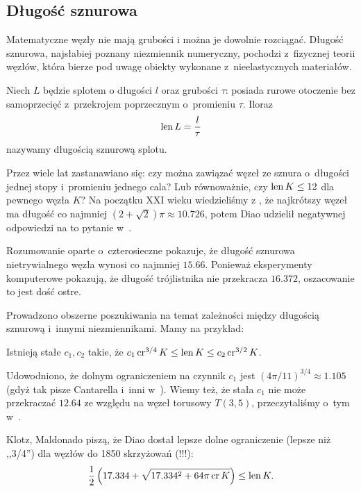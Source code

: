 
\subsection{Długość sznurowa}
%
Matematyczne węzły nie mają grubości i można je dowolnie rozciągać.
Długość sznurowa, najsłabiej poznany niezmiennik numeryczny, pochodzi z~fizycznej teorii węzłów, która bierze pod uwagę obiekty wykonane z~nieelastycznych materiałów.

\begin{definition}
    Niech $L$ będzie splotem o długości $l$ oraz grubości $\tau$: posiada rurowe otoczenie bez samoprzecięć z~przekrojem poprzecznym o~promieniu $\tau$.
    Iloraz
    \begin{equation}
        \operatorname{len} L = \frac l \tau
    \end{equation}
    nazywamy długością sznurową splotu.
\end{definition}

Przez wiele lat zastanawiano się: czy można zawiązać węzeł ze sznura o~długości jednej stopy i~promieniu jednego cala?
Lub równoważnie, czy $\operatorname{len} K \le 12$ dla pewnego węzła $K$?
Na początku XXI wieku wiedzieliśmy z \cite{cantarella02}, że najkrótszy węzeł ma długość co najmniej $(2 + \sqrt 2)\pi \approx 10.726$, potem Diao udzielił negatywnej odpowiedzi na to pytanie w~\cite[s. 14]{diao03}.

Rozumowanie \cite{denne06} oparte o~czterosieczne pokazuje, że długość sznurowa nietrywialnego węzła wynosi co najmniej $15.66$.
Ponieważ eksperymenty komputerowe pokazują, że długość trójlistnika nie przekracza $16.372$, oszacowanie to jest dość ostre.

Prowadzono obszerne poszukiwania na temat zależności między długością sznurową i~innymi niezmiennikami.
Mamy na przykład:

\begin{proposition}
    Istnieją stałe $c_1, c_2$ takie, że $c_1 \operatorname{cr}^{3/4} K \le \operatorname{len} K \le c_2 \operatorname{cr}^{3/2} K$.
\end{proposition}

Udowodniono, że dolnym ograniczeniem na czynnik $c_1$ jest $(4\pi/11)^{3/4} \approx 1.105$ (gdyż tak pisze Cantarella i~inni w~\cite[tw. 23]{cantarella02}).
Wiemy też, że stała $c_1$ nie może przekraczać $12.64$ ze względu na węzeł torusowy $T(3, 5)$, przeczytaliśmy o~tym w~\cite{klotz21}.

Klotz, Maldonado \cite{klotz21} piszą, że Diao dostał lepsze dolne ograniczenie (lepsze niż ,,3/4'') dla węzłów do 1850 skrzyżowań (!!!):
\begin{equation}
    \frac 12 \left(17.334 + \sqrt{17.334^2 + 64 \pi \operatorname{cr} K}\right) \le \operatorname{len} K.
\end{equation}

